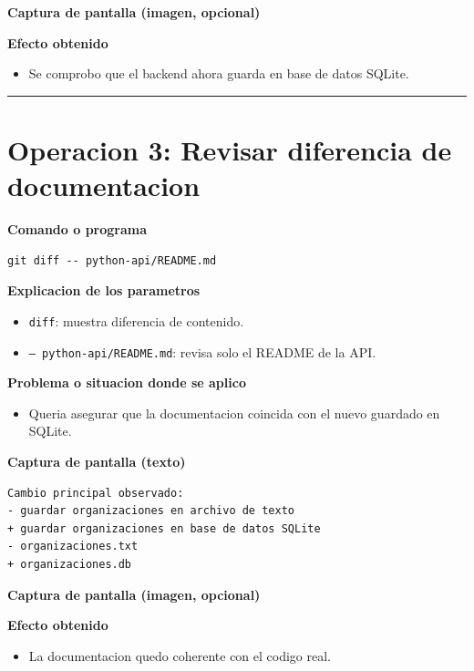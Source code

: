 \documentclass[12pt,a4paper]{article}
\begin{document}
\textbf{Captura de pantalla (imagen, opcional)}

\textbf{Efecto obtenido}
\begin{itemize}[leftmargin=*]
\item Se comprobo que el backend ahora guarda en base de datos SQLite.
\end{itemize}

\hrule
\vspace{0.4cm}

\section*{Operacion 3: Revisar diferencia de documentacion}
\textbf{Comando o programa}
\begin{Verbatim}[fontsize=\small,frame=single]
git diff -- python-api/README.md
\end{Verbatim}

\textbf{Explicacion de los parametros}
\begin{itemize}[leftmargin=*]
\item \texttt{diff}: muestra diferencia de contenido.
\item \texttt{-- python-api/README.md}: revisa solo el README de la API.
\end{itemize}

\textbf{Problema o situacion donde se aplico}
\begin{itemize}[leftmargin=*]
\item Queria asegurar que la documentacion coincida con el nuevo guardado en SQLite.
\end{itemize}

\textbf{Captura de pantalla (texto)}
\begin{Verbatim}[fontsize=\small,frame=single]
Cambio principal observado:
- guardar organizaciones en archivo de texto
+ guardar organizaciones en base de datos SQLite
- organizaciones.txt
+ organizaciones.db
\end{Verbatim}

\textbf{Captura de pantalla (imagen, opcional)}

\textbf{Efecto obtenido}
\begin{itemize}[leftmargin=*]
\item La documentacion quedo coherente con el codigo real.
\end{itemize}
\end{document}
